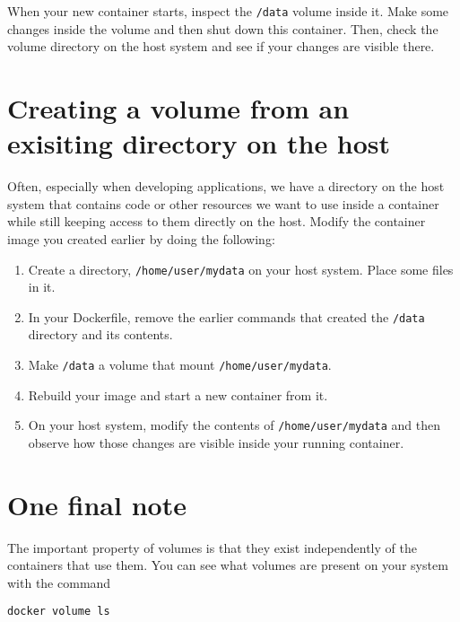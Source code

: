 \documentclass{article}
\begin{document}
When your new container starts, inspect the \texttt{/data} volume inside it.  Make some changes inside the volume and then shut down this container.  Then, check the volume directory on the host system and see if your changes are visible there.

\section{Creating a volume from an exisiting directory on the host}
Often, especially when developing applications, we have a directory on the host system that contains code or other resources we want to use inside a container while still keeping access to them directly on the host. Modify the container image you created earlier by doing the following:

\begin{enumerate}
	\item Create a directory, \texttt{/home/user/mydata} on your host system. Place some files in it.
	\item In your Dockerfile, remove the earlier commands that created the \texttt{/data} directory and its contents.
	\item Make \texttt{/data} a volume that mount \texttt{/home/user/mydata}.
	\item Rebuild your image and start a new container from it. 
	\item On your host system, modify the contents of \texttt{/home/user/mydata} and then observe how those changes are visible inside your running container.
\end{enumerate}

\section{One final note}
The important property of volumes is that they exist independently of the containers that use them. You can see what volumes are present on your system with the command

\texttt{docker volume ls}
\end{document}
